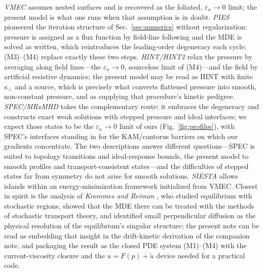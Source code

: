 \documentclass[english]{article}
\begin{document}
\emph{VMEC} \cite{hirshman1983} assumes nested surfaces and is recovered as the
foliated, $\varepsilon_\kappa\!\rightarrow\!0$ limit; the present model is what one runs when that
assumption is in doubt. \emph{PIES} \cite{reiman1986} pioneered the iteration structure of
Sec.~\ref{sec:numerics} without regularization: pressure is assigned as a flux function by
field-line following and the MDE is solved as written, which reintroduces the leading-order
degeneracy each cycle; (M3)--(M4) replace exactly these two steps. \emph{HINT/HINT2}
\cite{harafuji1989,suzuki2006} relax the pressure by averaging along field lines---the
$\varepsilon_\kappa\rightarrow0$, sourceless limit of (M4)---and the field by artificial resistive
dynamics; the present model may be read as HINT with finite $\kappa_\perp$ and a source, which is
precisely what converts flattened pressure into smooth, non-constant pressure, and as supplying
that procedure's kinetic pedigree. \emph{SPEC/MRxMHD} \cite{hudson2012} takes the complementary
route: it embraces the degeneracy and constructs exact weak solutions with stepped pressure and
ideal interfaces; we expect those states to be the $\varepsilon_\kappa\rightarrow0$ limit of ours
(Fig.~\ref{fig:profiles}), with SPEC's interfaces standing in for the KAM/cantorus barriers on
which our gradients concentrate. The two descriptions answer different questions---SPEC is suited
to topology transitions and ideal-response bounds, the present model to smooth profiles and
transport-consistent states---and the difficulties of stepped states far from symmetry
\cite{qu2021} do not arise for smooth solutions. \emph{SIESTA} \cite{hirshman2011} allows islands
within an energy-minimization framework initialized from VMEC. Closest in spirit is the analysis of
\emph{Krommes and Reiman} \cite{krommes2009}, who studied equilibrium with stochastic regions,
showed that the MDE there can be treated with the methods of stochastic transport theory, and
identified small perpendicular diffusion as the physical resolution of the equilibrium's singular
structure; the present note can be read as embedding that insight in the drift-kinetic derivation
of the companion note, and packaging the result as the closed PDE system (M1)--(M4) with the
current-viscosity closure and the $u=F(p)+\tilde u$ device needed for a practical code.
\end{document}
